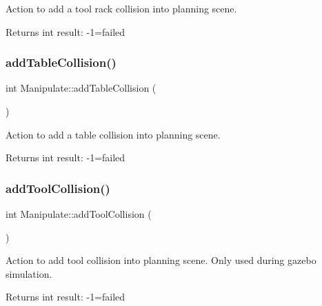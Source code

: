 Action to add a tool rack collision into planning scene. 

\begin{DoxyReturn}{Returns}
int result\+: -\/1=failed 
\end{DoxyReturn}
\mbox{\label{structManipulate_a1f4484286205d02906a0f8d0d1d50ba5}} 
\subsubsection{\texorpdfstring{add\+Table\+Collision()}{addTableCollision()}}
{\footnotesize\ttfamily int Manipulate\+::add\+Table\+Collision (\begin{DoxyParamCaption}{ }\end{DoxyParamCaption})\hspace{0.3cm}{\ttfamily [private]}}



Action to add a table collision into planning scene. 

\begin{DoxyReturn}{Returns}
int result\+: -\/1=failed 
\end{DoxyReturn}
\mbox{\label{structManipulate_a74221cc0607aabde800bb0a1f5c3e67d}} 
\subsubsection{\texorpdfstring{add\+Tool\+Collision()}{addToolCollision()}}
{\footnotesize\ttfamily int Manipulate\+::add\+Tool\+Collision (\begin{DoxyParamCaption}{ }\end{DoxyParamCaption})\hspace{0.3cm}{\ttfamily [private]}}



Action to add tool collision into planning scene. Only used during gazebo simulation. 

\begin{DoxyReturn}{Returns}
int result\+: -\/1=failed 
\end{DoxyReturn}
\mbox{\label{structManipulate_a39959395c5ee7d305eb9f1a306166abb}} 
